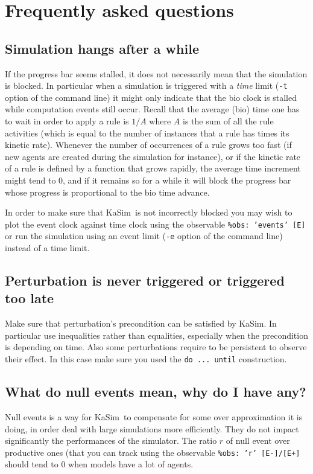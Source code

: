 \documentclass[11pt]{book}
\def\KaSim{\textsf{KaSim}}
\def\ttt#1{\texttt{#1}}
\begin{document}
\chapter{Frequently asked questions}
\section*{Simulation hangs after a while}
If the progress bar seems stalled, it does not necessarily mean that the simulation is blocked. In particular when a simulation is triggered with a \emph{time} limit (\ttt{-t} option of the command line) it might only indicate that the bio clock is stalled while computation events still occur. Recall that the average (bio) time one has to wait in order to apply a rule is $1/A$ where $A$ is the sum of all the rule activities (which is equal to the number of instances that a rule has times its kinetic rate). Whenever the number of occurrences of a rule grows too fast (if new agents are created during the simulation for instance), or if the kinetic rate of a rule is defined by a function that grows rapidly,  the average time increment might tend to 0, and if it remains so for a while it will block the progress bar whose progress is proportional to the bio time advance. 

In order to make sure that \KaSim~is not incorrectly blocked you may wish to plot the event clock against time clock using the observable \ttt{\%obs: 'events' [E]} or run the simulation using an event limit (\ttt{-e} option of the command line) instead of a time limit.

\section*{Perturbation is never triggered or triggered too late}
Make sure that perturbation's precondition can be satisfied by \KaSim. In particular use inequalities rather than equalities, especially when the precondition is depending on time. Also some perturbations require to be persistent to observe their effect. In this case make sure you used the \ttt{do ... until} construction.  

\section*{What do null events mean, why do I have any?}

Null events is a way for \KaSim~to compensate for some over approximation it is doing, in order deal with large simulations more efficiently. They do not impact significantly the performances of the simulator. The ratio $r$ of null event over productive ones (that you can track using the observable \ttt{\%obs: 'r'  [E-]/[E+]} should tend to 0 when models have a lot of agents.
\end{document}
